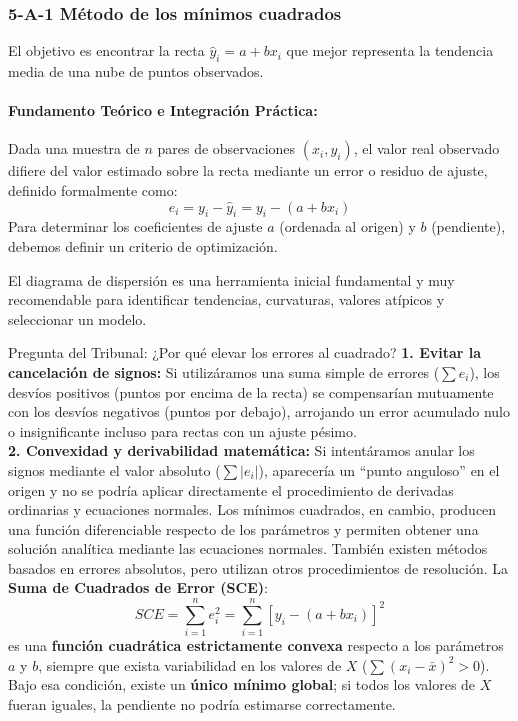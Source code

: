 \documentclass[11pt,letterpaper]{article}
\begin{document}
\subsubsection{5-A-1 Método de los mínimos cuadrados}
El objetivo es encontrar la recta $\hat{y}_i = a + b x_i$ que mejor representa la tendencia media de una nube de puntos observados.

\paragraph{Fundamento Teórico e Integración Práctica:}
Dada una muestra de $n$ pares de observaciones $(x_i, y_i)$, el valor real observado difiere del valor estimado sobre la recta mediante un error o residuo de ajuste, definido formalmente como:
\begin{equation}
    e_i = y_i - \hat{y}_i = y_i - (a + b x_i)
\end{equation}
Para determinar los coeficientes de ajuste $a$ (ordenada al origen) y $b$ (pendiente), debemos definir un criterio de optimización.

El diagrama de dispersión es una herramienta inicial fundamental y muy recomendable para identificar tendencias, curvaturas, valores atípicos y seleccionar un modelo.

\begin{alertaBox}{Pregunta del Tribunal: ¿Por qué elevar los errores al cuadrado?}
\textbf{1. Evitar la cancelación de signos:} Si utilizáramos una suma simple de errores ($\sum e_i$), los desvíos positivos (puntos por encima de la recta) se compensarían mutuamente con los desvíos negativos (puntos por debajo), arrojando un error acumulado nulo o insignificante incluso para rectas con un ajuste pésimo. \\
\textbf{2. Convexidad y derivabilidad matemática:} Si intentáramos anular los signos mediante el valor absoluto ($\sum |e_i|$), aparecería un ``punto anguloso'' en el origen y no se podría aplicar directamente el procedimiento de derivadas ordinarias y ecuaciones normales. Los mínimos cuadrados, en cambio, producen una función diferenciable respecto de los parámetros y permiten obtener una solución analítica mediante las ecuaciones normales. También existen métodos basados en errores absolutos, pero utilizan otros procedimientos de resolución. La \textbf{Suma de Cuadrados de Error (SCE)}:
\begin{equation}
    SCE = \sum_{i=1}^n e_i^2 = \sum_{i=1}^n [y_i - (a + b x_i)]^2
\end{equation}
es una \textbf{función cuadrática estrictamente convexa} respecto a los parámetros $a$ y $b$, siempre que exista variabilidad en los valores de $X$ ($\sum (x_i-\bar{x})^2>0$). Bajo esa condición, existe un \textbf{único mínimo global}; si todos los valores de $X$ fueran iguales, la pendiente no podría estimarse correctamente.
\end{alertaBox}
\end{document}
